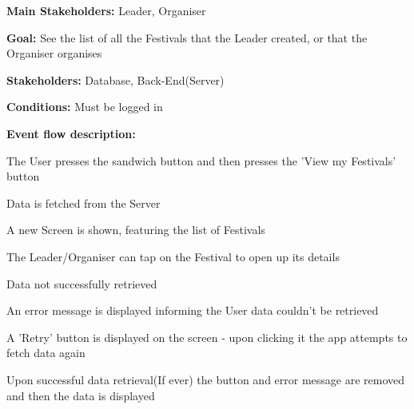 				\noindent {}
				\begin{packed_item}
					\item \textbf{Main Stakeholders:} Leader, Organiser
					\item \textbf{Goal:} See the list of all the Festivals that the Leader created, or that the Organiser organises
					\item \textbf{Stakeholders: } Database, Back-End(Server)
					\item \textbf{Conditions: } Must be logged in
					\item \textbf{Event flow description: }
					\begin{packed_enum}
						\item The User presses the sandwich button and then presses the 'View my Festivals' button
						\item Data is fetched from the Server
						\item A new Screen is shown, featuring the list of Festivals
						\item The Leader/Organiser can tap on the Festival to open up its details
					\end{packed_enum}
				
					\begin{packed_item}
						\item[1.a] Data not successfully retrieved
						\item[] \begin{packed_enum}
							\item An error message is displayed informing the User data couldn't be retrieved
							\item A 'Retry' button is displayed on the screen - upon clicking it the app attempts to fetch data again
							\item Upon successful data retrieval(If ever) the button and error message are removed and then the data is displayed
						\end{packed_enum}	
					\end{packed_item}
				\end{packed_item}
			
